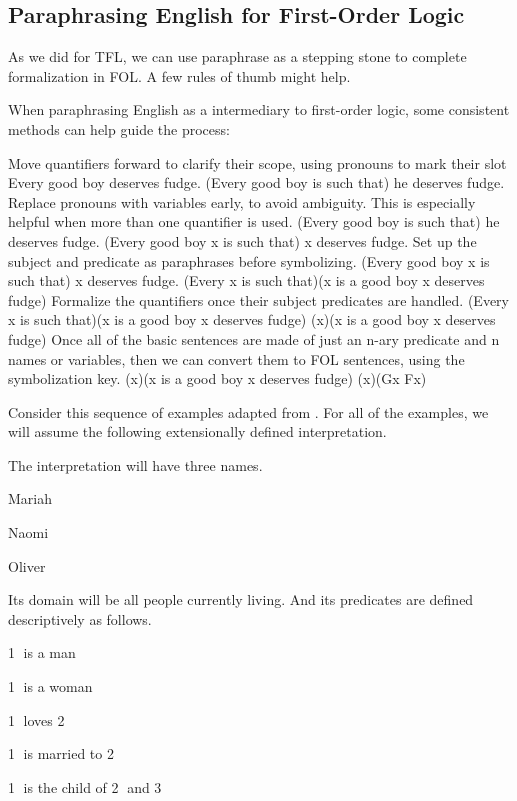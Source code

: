 \subsection{Paraphrasing English for First-Order Logic}

As we did for TFL, we can use paraphrase as a stepping stone to complete
formalization in FOL. A few rules of thumb might help.

\begin{fitchrule}
  When paraphrasing English as a intermediary to first-order logic, some
  consistent methods can help guide the process:
  \begin{outline}[enumerate]
    \1 Move quantifiers forward to clarify their scope, using pronouns to mark
    their slot
    \2 Every good boy deserves fudge.
    \2 (Every good boy is such that) he deserves fudge.
    \1 Replace pronouns with variables early, to avoid ambiguity. This is
    especially helpful when more than one quantifier is used.
    \2 (Every good boy is such that) he deserves fudge.
    \2 (Every good boy x is such that) x deserves fudge.
    \1 Set up the subject and predicate as paraphrases before symbolizing.
    \2 (Every good boy x is such that) x deserves fudge.
    \2 (Every x is such that)(x is a good boy \eif x deserves fudge)
    \1 Formalize the quantifiers once their subject predicates are handled.
    \2 (Every x is such that)(x is a good boy \eif x deserves fudge)
    \2 (\eforall x)(x is a good boy \eif x deserves fudge)
    \1 Once all of the basic sentences are made of just an n-ary predicate and
    n names or variables, then we can convert them to FOL sentences, using the
    symbolization key.
    \2 (\eforall x)(x is a good boy \eif x deserves fudge)
    \2 (\eforall x)(Gx \eif Fx)
  \end{outline}
\end{fitchrule}

Consider this sequence of examples adapted from \cite{Smi20}. For all of the
examples, we will assume the following extensionally defined interpretation.

\begin{interpretation}
  The interpretation will have three names.
  \begin{argument}
  \item[m:] Mariah
  \item[n:] Naomi
  \item[o:] Oliver
  \end{argument}
  Its domain will be all people currently living. And its predicates are defined
  descriptively as follows.
  \begin{argument}
  \item[F:] \textcircled{1} is a man
  \item[G:] \textcircled{1} is a woman
  \item[L:] \textcircled{1} loves \textcircled{2}
  \item[M:] \textcircled{1} is married to \textcircled{2}
  \item[R:] \textcircled{1} is the child of \textcircled{2} and \textcircled{3}
  \end{argument}
\end{interpretation}

